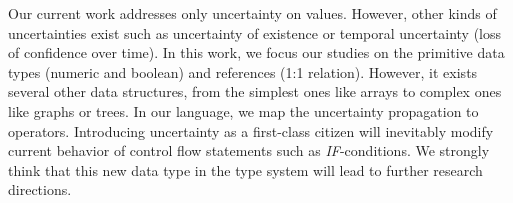Our current work addresses only uncertainty on values.
However, other kinds of uncertainties exist such as uncertainty of existence or temporal uncertainty (loss of confidence over time).
In this work, we focus our studies on the primitive data types (numeric and boolean) and references (1:1 relation).
However, it exists several other data structures, from the simplest ones like arrays to complex ones like graphs or trees.
In our language, we map the uncertainty propagation to operators.
Introducing uncertainty as a first-class citizen will inevitably modify current behavior of control flow statements such as \textit{IF}-conditions.
We strongly think that this new data type in the type system will lead to further research directions.

